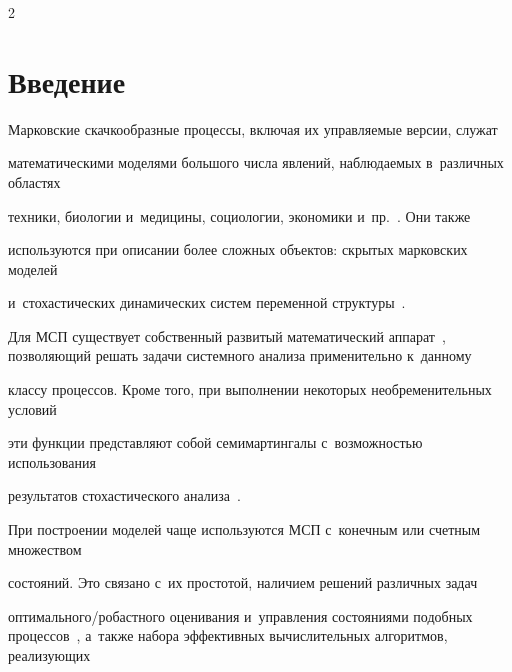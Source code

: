 \begin{multicols}{2}





\label{st\stat}








\section{Введение}





\vspace*{-8pt}





Марковские скачкообразные процессы, вклю\-чая их управ\-ля\-емые версии, служат 


математическими моделями большого числа явлений, наблюдаемых в~различных областях 


техники, биологии и~медицины, социологии, экономики и~пр.~\cite{W_93}. Они так\-же 


используются при описании более сложных объектов: скрытых марковских моделей 


и~стохастических динамических сис\-тем переменной структуры~\cite{EM_02, DLW_23}.





Для МСП существует собственный развитый математический аппарат~\cite{D_63, GS_73_2}, позволяющий решать задачи системного анализа применительно к~данному 


классу процессов. Кроме того, при выполнении некоторых необременительных условий 


эти функции представляют собой семимартингалы с~возможностью использования 


результатов стохастического анализа~\cite{LSh_86}.





При построении моделей чаще используются МСП с~конечным или счетным множеством 


состояний. Это связано с~их простотой, наличием решений различных задач 


оп\-ти\-маль\-но\-го/ро\-баст\-но\-го оценивания и~управления состояниями подобных процессов~\cite{EAM_10}, а~также набора эффективных вычислительных алгоритмов, реализующих 



\end{multicols}

